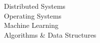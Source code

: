\documentclass[a4paper]{article}
\begin{document}
\begin{minipage}[t]{0.34\textwidth}
\vspace{14pt}
\noindent\hspace{8pt}{\footnotesize \color{headingbg}\rule{0.85\textwidth}{0.4pt}}

\vspace{6pt}

\vspace{4pt}
\hspace{8pt}
{\footnotesize
Distributed Systems \\
Operating Systems \\
Machine Learning \\
Algorithms \& Data Structures
}

\end{minipage}%
\end{document}
